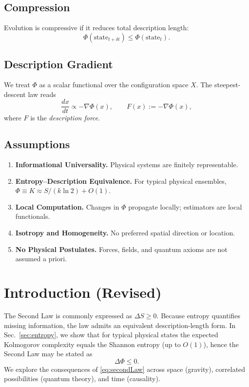 \documentclass[aps,preprint,onecolumn,longbibliography,nofootinbib]{revtex4-2}
\numberwithin{equation}{section}        %
\begin{document}
\subsection{Compression}
Evolution is compressive if it reduces total description length:
\begin{equation}
\Phi(\text{state}_{t+\delta t}) \le \Phi(\text{state}_{t}). \label{eq:compressive}
\end{equation}

\subsection{Description Gradient}
We treat $\Phi$ as a scalar functional over the configuration space $X$. The steepest-descent law reads
\begin{equation}
\frac{dx}{dt} \propto -\nabla \Phi(x), \qquad F(x) := -\nabla\Phi(x), \label{eq:desc}
\end{equation}
where $F$ is the \emph{description force}.

\subsection*{Assumptions}
\begin{enumerate}
\item \textbf{Informational Universality.} Physical systems are finitely representable.
\item \textbf{Entropy--Description Equivalence.} For typical physical ensembles, $\Phi \equiv K \approx S/(k\ln2) + O(1)$.
\item \textbf{Local Computation.} Changes in $\Phi$ propagate locally; estimators are local functionals.
\item \textbf{Isotropy and Homogeneity.} No preferred spatial direction or location.
\item \textbf{No Physical Postulates.} Forces, fields, and quantum axioms are not assumed a priori.
\end{enumerate}

\section{Introduction (Revised)}
The Second Law is commonly expressed as $\Delta S \ge 0$. Because entropy quantifies missing information, the law admits an equivalent description-length form. In Sec.~\ref{sec:entropy}, we show that for typical physical states the expected Kolmogorov complexity equals the Shannon entropy (up to $O(1)$), hence the Second Law may be stated as
\begin{equation}
\Delta\Phi \le 0. \label{eq:secondLaw}
\end{equation}
We explore the consequences of \eqref{eq:secondLaw} across space (gravity), correlated possibilities (quantum theory), and time (causality).
\end{document}
